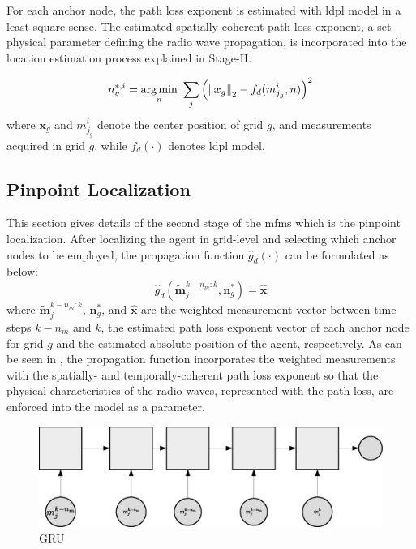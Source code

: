     For each anchor node, the path loss exponent is estimated with \gls{ldpl} model in a least square sense.
    The estimated spatially-coherent path loss exponent, a set physical parameter defining the radio wave propagation, is incorporated into the location estimation process explained in Stage-II\@.

    \begin{equation}
        n^{*,i}_g = \operatorname*{arg\,min}_n\ \sum_j \left(\left\lVert\bm{x}_g\right\rVert_2 - f_d(m^i_{j_g},n)\right)^2
    \end{equation}
    where $\bm{x}_g$ and $m^i_{j_g}$ denote the center position of grid $g$, and measurements acquired in grid $g$, while $f_d(\cdot)$ denotes \gls{ldpl} model.

    \subsection{Pinpoint Localization}
    This section gives details of the second stage of the \gls{mfms} which is the pinpoint localization.
    After localizing the agent in grid-level and selecting which anchor nodes to be employed, the propagation function $\hat{g}_d(\cdot)$ can be formulated as below:
    \begin{equation}
        \label{eq:propfunct}
        \hat{g}_d(\bm{\widetilde{m}}^{k-n_{m}:k}_j, \bm{n}^*_g)= \bm{\hat{x}}
    \end{equation}
    where $\bm{\widetilde{m}}^{k-n_{m}:k}_j$, $\bm{n}^*_g$, and $\bm{\hat{x}}$ are the weighted measurement vector between time steps $k-n_m$ and $k$, the estimated path loss exponent vector of each anchor node for grid $g$ and the estimated absolute position of the agent, respectively.
    As can be seen in , the propagation function incorporates the weighted measurements with the spatially- and temporally-coherent path loss exponent so that the physical characteristics of the radio waves, represented with the path loss, are enforced into the model as a parameter.

    \begin{figure}[thpb]
       \centering
       \includegraphics[width=\linewidth]{figures/gru.eps}
       \caption{\label{fig:gru}GRU}
    \end{figure}

